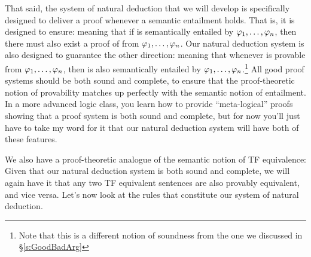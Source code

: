 That said, the system of natural deduction that we will develop is specifically designed to deliver a proof whenever a semantic entailment holds.  That is, it is designed to ensure:
meaning that if \meta{\psi} is semantically entailed by $\mathcal{\varphi}_1, \ldots, \mathcal{\varphi}_n$, then there must also exist a proof of \meta{\psi} from $\mathcal{\varphi}_1, \ldots, \mathcal{\varphi}_n$.    Our natural deduction system is also designed to guarantee the other direction:
meaning that whenever \meta{\psi} is provable from $\mathcal{\varphi}_1, \ldots, \mathcal{\varphi}_n$, then \meta{\psi} is also semantically entailed by $\mathcal{\varphi}_1, \ldots, \mathcal{\varphi}_n$.\footnote{Note that this is a different notion of soundness from the one we discussed in \S \ref{s:GoodBadArg}}  All good proof systems should be both sound and complete, to ensure that the proof-theoretic notion of provability matches up perfectly with the semantic notion of entailment. In a more advanced logic class, you learn how to provide ``meta-logical'' proofs showing that a proof system is both sound and complete, but for now you'll just have to take my word for it that our natural deduction system will have both of these features.

We also have a proof-theoretic analogue of the semantic notion of TF equivalence:
Given that our natural deduction system is both sound and complete, we will again have it that any two TF equivalent sentences are also provably equivalent, and vice versa.  Let's now look at the rules that constitute our system of natural deduction.







